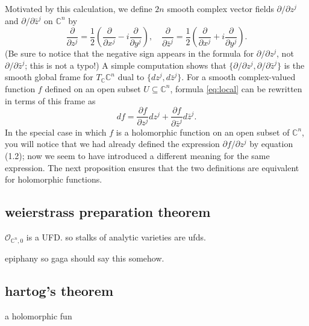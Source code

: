 Motivated by this calculation, we define $2n$ smooth complex vector fields $\partial/\partial z^j$ and $\partial/\partial \bar{z}^j$ on $\mathbb{C}^n$ by
\begin{equation*}
\frac{\partial}{\partial z^j} = \frac{1}{2}\left(\frac{\partial}{\partial x^j} - i\frac{\partial}{\partial y^j}\right), \quad
\frac{\partial}{\partial \bar{z}^j} = \frac{1}{2}\left(\frac{\partial}{\partial x^j} + i\frac{\partial}{\partial y^j}\right).
\end{equation*}
(Be sure to notice that the negative sign appears in the formula for $\partial/\partial z^j$, not $\partial/\partial \bar{z}^j$; this is not a typo!) A simple computation shows that $\{\partial/\partial z^j, \partial/\partial \bar{z}^j\}$ is the smooth global frame for $T_\mathbb{C}\mathbb{C}^n$ dual to $\{dz^j, d\bar{z}^j\}$. For a smooth complex-valued function $f$ defined on an open subset $U \subseteq \mathbb{C}^n$, formula \cref{eq:local} can be rewritten in terms of this frame as
\begin{equation*}
  df = \frac{\partial f}{\partial z^j} dz^j + \frac{\partial f}{\partial \bar{z}^j} d\bar{z}^j.
\end{equation*}
In the special case in which $f$ is a holomorphic function on an open subset of $\mathbb{C}^n$, you will notice that we had already defined the expression $\partial f/\partial z^j$ by equation (1.2); now we seem to have introduced a different meaning for the same expression. The next proposition ensures that the two definitions are equivalent for holomorphic functions.


\subsection{weierstrass preparation theorem}

\begin{coro}\leavevmode
\(\mathcal{O}_{\mathbb{C}^n,0}\) is a UFD. so stalks of analytic varieties are ufds.
\end{coro}

\begin{thing7}{epiphany}\leavevmode
so gaga should say this somehow.
\end{thing7}

\subsection{hartog's theorem}

a holomorphic fun

